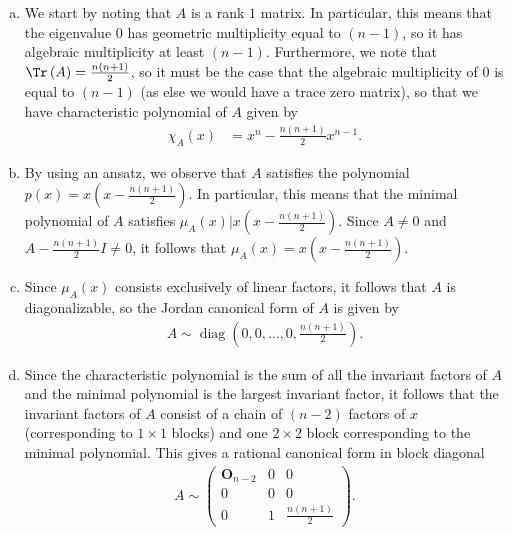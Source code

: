 \documentclass[10pt]{mypackage}
\begin{document}
\begin{solution}\hfill
  \begin{enumerate}[(a)]
    \item We start by noting that $A$ is a rank $1$ matrix. In particular, this means that the eigenvalue $0$ has geometric multiplicity equal to $\left( n-1 \right)$, so it has algebraic multiplicity at least $\left( n-1 \right)$. Furthermore, we note that $\Tr\left( A \right) = \frac{n\left( n+1 \right)}{2}$, so it must be the case that the algebraic multiplicity of $0$ is equal to $\left( n-1 \right)$ (as else we would have a trace zero matrix), so that we have characteristic polynomial of $A$ given by
      \begin{align*}
        \chi_A(x) &= x^{n} - \frac{n\left( n+1 \right)}{2}x^{n-1}.
      \end{align*}
    \item By using an ansatz, we observe that $A$ satisfies the polynomial $p(x) = x\left( x-\frac{n\left( n+1 \right)}{2} \right)$. In particular, this means that the minimal polynomial of $A$ satisfies $\mu_A(x) | x\left( x-\frac{n\left( n+1 \right)}{2} \right)$. Since $A\neq 0$ and $A - \frac{n\left( n+1 \right)}{2}I\neq 0$, it follows that $\mu_A(x) = x\left( x-\frac{n\left( n+1 \right)}{2} \right)$.
    \item Since $\mu_A(x)$ consists exclusively of linear factors, it follows that $A$ is diagonalizable, so the Jordan canonical form of $A$ is given by
      \begin{align*}
        A \sim \operatorname{diag}\left( 0,0,\dots,0,\frac{n\left( n+1 \right)}{2} \right).
      \end{align*}
    \item Since the characteristic polynomial is the sum of all the invariant factors of $A$ and the minimal polynomial is the largest invariant factor, it follows that the invariant factors of $A$ consist of a chain of $\left( n-2 \right)$ factors of $x$ (corresponding to $1\times 1$ blocks) and one $2\times 2$ block corresponding to the minimal polynomial. This gives a rational canonical form in block diagonal
      \begin{align*}
        A \sim \begin{pmatrix} \mathbf{O}_{n-2} & 0 & 0 \\ 0 & 0 & 0 \\ 0 & 1 & \frac{n\left( n+1 \right)}{2}\end{pmatrix}.
      \end{align*}
  \end{enumerate}
\end{solution}
\end{document}
